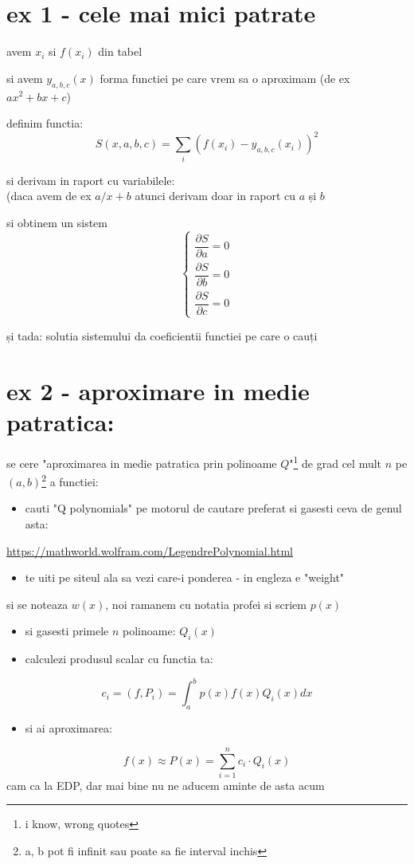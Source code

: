 \documentclass[11pt]{article}
\date{\today}
\title{}
\begin{document}
\section*{ex 1 - cele mai mici patrate}
\label{sec:org0632c50}

avem \(x_i\) si \(f(x_i)\) din tabel
\medskip

si avem  \(y_{a, b, c} (x)\) forma functiei pe care vrem sa o aproximam (de ex \(ax^2+bx+c\))
\medskip

definim functia: 
\[ S(x, a, b, c) = \sum_i (f(x_i) - y_{a, b,c} (x_i))^2 \]

si derivam in raport cu variabilele:\\
(daca avem de ex \(a/x+b\) atunci derivam doar in raport cu \(a\) și \(b\)

\medskip

si obtinem un sistem
\[
\begin{cases}
\dfrac{\partial S}{\partial a} = 0\\[1em]
\dfrac{\partial S}{\partial b} = 0\\[1em]
\dfrac{\partial S}{\partial c} = 0
\end{cases}
\]

și tada: solutia sistemului da coeficientii functiei pe care o cauți

\section*{ex 2 - aproximare in medie patratica:}
\label{sec:orgd4fd3b3}
se cere "aproximarea in medie patratica prin polinoame \(Q\)"\footnote{i know, wrong quotes} de grad cel mult \(n\) pe 
\((a, b)\)\footnote{a, b pot fi infinit sau poate sa fie interval inchis} a functiei:

\begin{itemize}
\item cauti "Q polynomials" pe motorul de cautare preferat si gasesti ceva de genul asta:
\end{itemize}
\url{https://mathworld.wolfram.com/LegendrePolynomial.html}
\begin{itemize}
\item te uiti pe siteul ala sa vezi care-i ponderea - in engleza e "weight"
\end{itemize}
si se noteaza \(w(x)\), noi ramanem cu notatia profei si scriem \(p(x)\)
\begin{itemize}
\item si gasesti primele \(n\) polinoame: \(Q_i(x)\)
\item calculezi produsul scalar cu functia ta:
\end{itemize}
\[ c_i = (f, P_i) = \int_a^b p(x) f(x) Q_i(x) dx \]
\begin{itemize}
\item si ai aproximarea:
\end{itemize}
\[ f(x) \approx P(x) = \sum_{i=1}^{n} c_i \cdot Q_i(x) \]
cam ca la EDP, dar mai bine nu ne aducem aminte de asta acum
\end{document}

